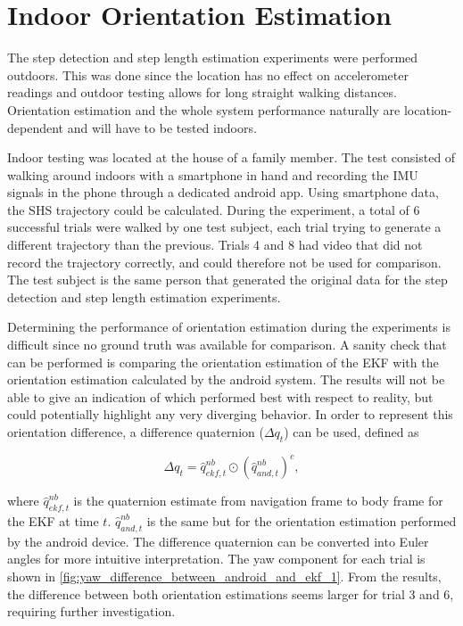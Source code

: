 \section{Indoor Orientation Estimation}

The step detection and step length estimation experiments were performed outdoors. This was done since the location has no effect on accelerometer readings and outdoor testing allows for long straight walking distances. Orientation estimation and the whole system performance naturally are location-dependent and will have to be tested indoors. \par

Indoor testing was located at the house of a family member. The test consisted of walking around indoors with a smartphone in hand and recording the IMU signals in the phone through a dedicated android app. Using smartphone data, the SHS trajectory could be calculated. During the experiment, a total of 6 successful trials were walked by one test subject, each trial trying to generate a different trajectory than the previous. Trials 4 and 8 had video that did not record the trajectory correctly, and could therefore not be used for comparison. The test subject is the same person that generated the original data for the step detection and step length estimation experiments.\par 

Determining the performance of orientation estimation during the experiments is difficult since no ground truth was available for comparison. A sanity check that can be performed is comparing the orientation estimation of the EKF with the orientation estimation calculated by the android system. The results will not be able to give an indication of which performed best with respect to reality, but could potentially highlight any very diverging behavior. In order to represent this orientation difference, a difference quaternion ($	\Delta q_t$) can be used, defined as \cite{Kok2017}

\begin{equation}
	\Delta q_t = \hat{q}_{ekf,t}^{nb} \odot \left( \hat{q}_{and,t}^{nb}  \right)^c,
\end{equation} 

where $\hat{q}_{ekf,t}^{nb}$ is the quaternion estimate from navigation frame to body frame for the EKF at time $t$. $\hat{q}_{and,t}^{nb}$ is the same but for the orientation estimation performed by the android device. The difference quaternion can be converted into Euler angles for more intuitive interpretation. The yaw component for each trial is shown in  \cref{fig:yaw_difference_between_android_and_ekf_1}. From the results, the difference between both orientation estimations seems larger for trial 3 and 6, requiring further investigation.

